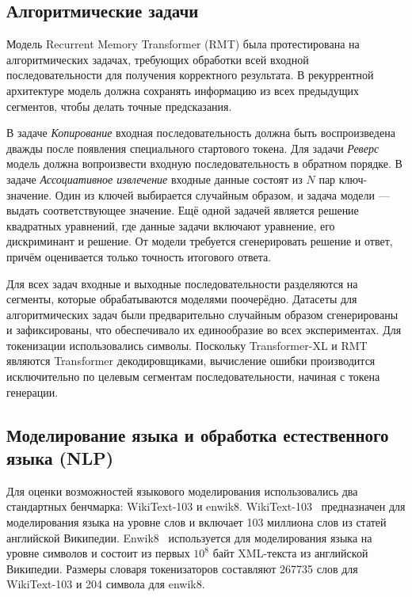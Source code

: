 \subsection{Алгоритмические задачи}

Модель Recurrent Memory Transformer (RMT) была протестирована на алгоритмических задачах, требующих обработки всей входной последовательности для получения корректного результата. В рекуррентной архитектуре модель должна сохранять информацию из всех предыдущих сегментов, чтобы делать точные предсказания.

В задаче \textit{Копирование} входная последовательность должна быть воспроизведена дважды после появления специального стартового токена. Для задачи \textit{Реверс} модель должна вопроизвести входную последовательность в обратном порядке. В задаче \textit{Ассоциативное извлечение} входные данные состоят из $N$ пар ключ-значение. Один из ключей выбирается случайным образом, и задача модели — выдать соответствующее значение. Ещё одной задачей является решение квадратных уравнений, где данные задачи включают уравнение, его дискриминант и решение. От модели требуется сгенерировать решение и ответ, причём оценивается только точность итогового ответа.

Для всех задач входные и выходные последовательности разделяются на сегменты, которые обрабатываются моделями поочерёдно. Датасеты для алгоритмических задач были предварительно случайным образом сгенерированы и зафиксированы, что обеспечивало их единообразие во всех экспериментах. Для токенизации использовались символы. Поскольку Transformer-XL и RMT являются Transformer декодировщиками, вычисление ошибки производится исключительно по целевым сегментам последовательности, начиная с токена генерации. %

\subsection{Моделирование языка и обработка естественного языка (NLP)}

Для оценки возможностей языкового моделирования использовались два стандартных бенчмарка: WikiText-103 и enwik8. WikiText-103~\cite{merity2017wikitext} предназначен для моделирования языка на уровне слов и включает 103 миллиона слов из статей английской Википедии. Enwik8~\cite{enwik8} используется для моделирования языка на уровне символов и состоит из первых $10^8$ байт XML-текста из английской Википедии. Размеры словаря токенизаторов составляют 267735 слов для WikiText-103 и 204 символа для enwik8.


